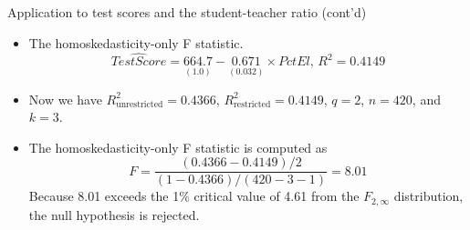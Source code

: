 \documentclass[presentation,10pt]{beamer}
\begin{document}
\begin{frame}[label={sec:org7f65352}]{Application to test scores and the student-teacher ratio (cont'd)}
\begin{itemize}
\item The homoskedasticity-only F statistic.
\begin{equation*}
\widehat{TestScore} = \underset{{\displaystyle (1.0)}}{664.7}
 -\underset{\displaystyle (0.032)}{0.671} \times PctEl,\, R^2 = 0.4149
\end{equation*}

\item Now we have \(R^2_{\text{unrestricted}} = 0.4366\),
\(R^2_{\text{restricted}} = 0.4149\), \(q=2\), \(n = 420\), and \(k = 3\).

\item The homoskedasticity-only F statistic is computed as
\[F=\frac{(0.4366 - 0.4149)/2}{(1-0.4366)/(420-3-1)} = 8.01 \]
Because 8.01 exceeds the 1\% critical value of 4.61 from the
\(F_{2,\infty}\) distribution, the null hypothesis is rejected.
\end{itemize}
\end{frame}
\end{document}
